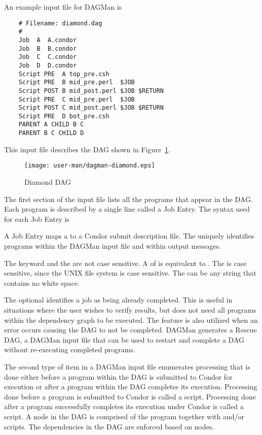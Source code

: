 An example input file for DAGMan is

\begin{verbatim}
	# Filename: diamond.dag
	#
	Job  A  A.condor 
	Job  B  B.condor 
	Job  C  C.condor	
	Job  D  D.condor
	Script PRE  A top_pre.csh
	Script PRE  B mid_pre.perl  $JOB
	Script POST B mid_post.perl $JOB $RETURN
	Script PRE  C mid_pre.perl  $JOB
	Script POST C mid_post.perl $JOB $RETURN
	Script PRE  D bot_pre.csh
	PARENT A CHILD B C
	PARENT B C CHILD D
\end{verbatim}

This input file describes the DAG shown in 
Figure~\ref{fig:dagman-diamond}.

\begin{figure}[hbt]
\centering
\texttt{[image: user-man/dagman-diamond.eps]}
\caption{\label{fig:dagman-diamond}Diamond DAG}
\end{figure}



The first section of the input file lists
all the programs that appear in the DAG.
Each program is described by a single line called a Job Entry.
The syntax used for each Job Entry is

   

A Job Entry maps a  to a Condor submit description file.
The  uniquely identifies programs within the
DAGMan input file and within output messages.

The keyword  and the  are not case sensitive.
A  of  is equivalent to .
The  is case sensitive, since
the UNIX file system is case sensitive.
The  can be any string that contains no white space.

The optional  identifies a job as being already
completed.
This is useful in situations where the user wishes to verify results,
but does not need all programs within the dependency graph to be executed.
The  feature is also utilized when
an error occurs causing the DAG to not be completed.
DAGMan generates a Rescue DAG, a DAGMan input file that can be
used to restart and complete a DAG without re-executing
completed programs.

The second type of item in a DAGMan input file enumerates
processing that is done either before a program within
the DAG is submitted to Condor for execution
or after
a program within
the DAG completes its execution.
Processing done before a program is submitted to Condor is
called a  script.
Processing done after a program successfully completes
its execution under Condor is
called a  script.
A node in the DAG is comprised of the program together with
 and/or  scripts.
The dependencies in the DAG are enforced based on nodes.

